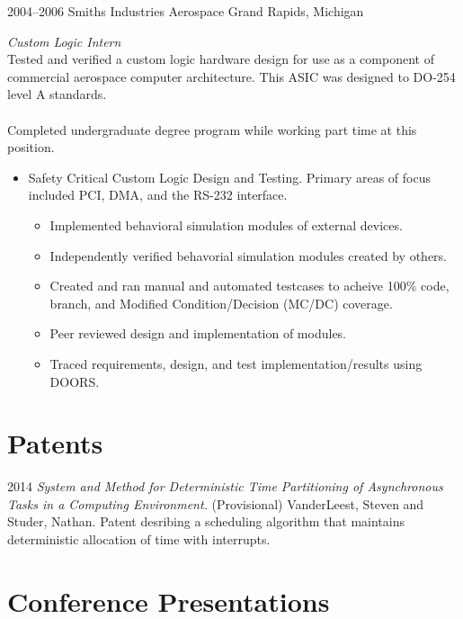\documentclass[print]{template/friggeri-cv} %
\begin{document}
\begin{entrylist}

\entry
{2004--2006}
{Smiths Industries Aerospace}
{Grand Rapids, Michigan}
{\emph{Custom Logic Intern} \\
Tested and verified a custom logic hardware design for use as a component of commercial aerospace computer architecture.  This ASIC was designed to DO-254 level A standards.  
\\
\\
Completed undergraduate degree program while working part time at this position.
\begin{itemize}
\item Safety Critical Custom Logic Design and Testing.  Primary areas of focus included PCI, DMA, and the RS-232 interface.
\begin{itemize}
\item Implemented behavioral simulation modules of external devices.
\item Independently verified behavorial simulation modules created by others.
\item Created and ran manual and automated testcases to acheive 100\% code, branch, and Modified Condition/Decision (MC/DC) coverage.
\item Peer reviewed design and implementation of modules.
\item Traced requirements, design, and test implementation/results using DOORS.
\end{itemize}
\end{itemize}}

\end{entrylist}

\section{Patents}

\begin{entrylist}
\entry
{2014}
{\emph{System and Method for Deterministic Time Partitioning of Asynchronous Tasks in a Computing Environment.} (Provisional)}
{VanderLeest, Steven and Studer, Nathan.}
{Patent desribing a scheduling algorithm that maintains deterministic allocation of time with interrupts.}
\end{entrylist}

\section{Conference Presentations}
\end{document}
